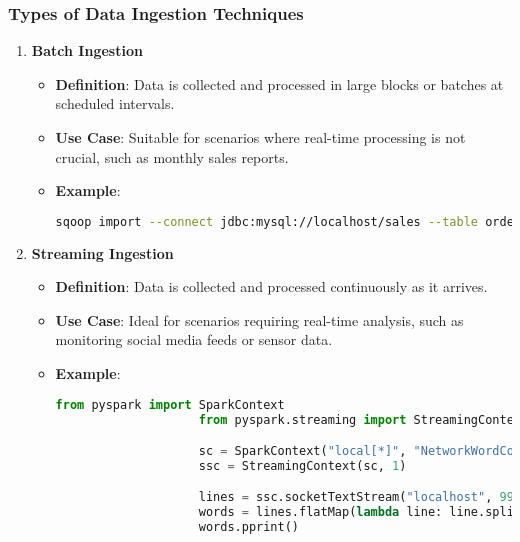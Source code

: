 \documentclass{beamer}
\begin{document}
\begin{frame}[fragile]
    \frametitle{Types of Data Ingestion Techniques}
    \begin{enumerate}
        \item \textbf{Batch Ingestion}
            \begin{itemize}
                \item \textbf{Definition}: Data is collected and processed in large blocks or batches at scheduled intervals.
                \item \textbf{Use Case}: Suitable for scenarios where real-time processing is not crucial, such as monthly sales reports.
                \item \textbf{Example}:
                    \begin{lstlisting}[language=bash]
                    sqoop import --connect jdbc:mysql://localhost/sales --table orders --target-dir /user/hadoop/orders
                    \end{lstlisting}
            \end{itemize}
        
        \item \textbf{Streaming Ingestion}
            \begin{itemize}
                \item \textbf{Definition}: Data is collected and processed continuously as it arrives.
                \item \textbf{Use Case}: Ideal for scenarios requiring real-time analysis, such as monitoring social media feeds or sensor data.
                \item \textbf{Example}:
                    \begin{lstlisting}[language=python]
                    from pyspark import SparkContext
                    from pyspark.streaming import StreamingContext

                    sc = SparkContext("local[*]", "NetworkWordCount")
                    ssc = StreamingContext(sc, 1)

                    lines = ssc.socketTextStream("localhost", 9999)
                    words = lines.flatMap(lambda line: line.split(" "))
                    words.pprint()
                    \end{lstlisting}
            \end{itemize}
    \end{enumerate}
\end{frame}
\end{document}
